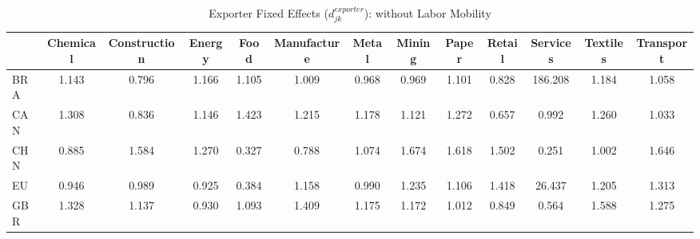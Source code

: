 \begin{table}[htbp]
\centering
\caption{Exporter Fixed Effects ($d_{jk}^{exporter}$): without Labor Mobility} 
\label{tab:exporter_effects}
\begin{tabular}{lcccccccccccc}
  \hline
 & Chemical & Construction & Energy & Food & Manufacture & Metal & Mining & Paper & Retail & Services & Textiles & Transport \\ 
  \hline
BRA & \textcolor[RGB]{115,74,140}{1.143} & \textcolor[RGB]{225,146,30}{0.796} & \textcolor[RGB]{106,69,149}{1.166} & \textcolor[RGB]{134,87,121}{1.105} & \textcolor[RGB]{170,110,85}{1.009} & \textcolor[RGB]{189,122,66}{0.968} & \textcolor[RGB]{187,121,68}{0.969} & \textcolor[RGB]{136,88,119}{1.101} & \textcolor[RGB]{223,144,32}{0.828} & \textcolor[RGB]{2,1,253}{186.208} & \textcolor[RGB]{96,62,159}{1.184} & \textcolor[RGB]{151,98,104}{1.058} \\ 
  CAN & \textcolor[RGB]{66,43,189}{1.308} & \textcolor[RGB]{221,143,34}{0.836} & \textcolor[RGB]{113,73,142}{1.146} & \textcolor[RGB]{42,27,212}{1.423} & \textcolor[RGB]{91,59,164}{1.215} & \textcolor[RGB]{98,63,157}{1.178} & \textcolor[RGB]{125,81,130}{1.121} & \textcolor[RGB]{72,47,183}{1.272} & \textcolor[RGB]{234,151,21}{0.657} & \textcolor[RGB]{176,114,79}{0.992} & \textcolor[RGB]{79,51,176}{1.260} & \textcolor[RGB]{162,104,94}{1.033} \\ 
  CHN & \textcolor[RGB]{212,138,42}{0.885} & \textcolor[RGB]{32,21,223}{1.584} & \textcolor[RGB]{74,48,181}{1.270} & \textcolor[RGB]{246,160,8}{0.327} & \textcolor[RGB]{227,147,28}{0.788} & \textcolor[RGB]{144,94,110}{1.074} & \textcolor[RGB]{19,12,236}{1.674} & \textcolor[RGB]{25,16,230}{1.618} & \textcolor[RGB]{38,25,217}{1.502} & \textcolor[RGB]{251,162,4}{0.251} & \textcolor[RGB]{174,113,81}{1.002} & \textcolor[RGB]{21,14,234}{1.646} \\ 
  EU & \textcolor[RGB]{198,128,57}{0.946} & \textcolor[RGB]{181,117,74}{0.989} & \textcolor[RGB]{204,132,51}{0.925} & \textcolor[RGB]{244,158,11}{0.384} & \textcolor[RGB]{108,70,147}{1.158} & \textcolor[RGB]{178,115,76}{0.990} & \textcolor[RGB]{83,54,172}{1.235} & \textcolor[RGB]{132,85,123}{1.106} & \textcolor[RGB]{47,30,208}{1.418} & \textcolor[RGB]{6,4,249}{26.437} & \textcolor[RGB]{94,61,162}{1.205} & \textcolor[RGB]{64,41,191}{1.313} \\ 
  GBR & \textcolor[RGB]{55,36,200}{1.328} & \textcolor[RGB]{117,76,138}{1.137} & \textcolor[RGB]{200,129,55}{0.930} & \textcolor[RGB]{138,89,117}{1.093} & \textcolor[RGB]{49,32,206}{1.409} & \textcolor[RGB]{100,65,155}{1.175} & \textcolor[RGB]{104,67,151}{1.172} & \textcolor[RGB]{166,107,89}{1.012} & \textcolor[RGB]{219,142,36}{0.849} & \textcolor[RGB]{238,154,17}{0.564} & \textcolor[RGB]{30,19,225}{1.588} & \textcolor[RGB]{70,45,185}{1.275} \\ 

\end{tabular}
\end{table}
